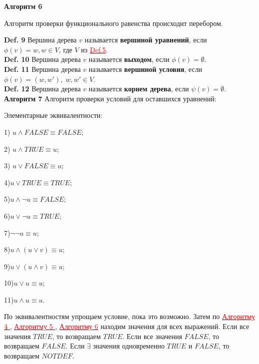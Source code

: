 \documentclass[12pt]{article}
\begin{document}
      \hypertarget{a6}{{\bf Алгоритм 6}} Алгоритм проверки функционального равенства происходит перебором.
     
     
     {\bf Def. 9} Вершина дерева $v$ называется {\bf вершиной уравнений}, если
     $\phi(v)=w , w \in V$, где $V$ из \hyperlink{d5}{ \textcolor{red}{Def.5}}.
     \\
     
     {\bf Def. 10} Вершина дерева $v$ называется {\bf выходом}, если
     $\phi(v)= \emptyset$.
     \\
      
     {\bf Def. 11} Вершина дерева $v$ называется {\bf вершиной условия}, если
     $\phi(v)=(w,w') ,\; w,w' \in V$.
     \\
     
     {\bf Def. 12}  Вершина дерева $v$ называется {\bf корнем дерева}, если
      $\psi(v) = \emptyset$.
      \\
      
      \hypertarget{a7}{{\bf Алгоритм 7}} Алгоритм проверки условий для оставшихся уравнений:
      
      Элементарные эквивалентности:
      
     1) $u\wedge FALSE\equiv FALSE$;
     
     2) $u\wedge TRUE\equiv u$;
     
     3) $u\vee FALSE\equiv u$;
     
     4)$u\vee TRUE\equiv TRUE$;
     
     5)$u \wedge \neg u \equiv FALSE$;
     
     6)$u \vee \neg u \equiv TRUE$;
     
     7)$\neg \neg u \equiv u$;
     
     8)$u\wedge (u \vee v)\equiv u$;
     
     9)$u\vee (u \wedge v)\equiv u$;
     
     10)$u \vee u \equiv u$;
     
     11)$u \wedge u \equiv u$.
     
       
       По эквивалентностям упрощаем условие, пока это возможно. Затем по   \hyperlink{a4}{ \textcolor{red}{Алгоритму 4 }},  \hyperlink{a5}{ \textcolor{red}{Алгоритму 5 }},  \hyperlink{a6}{ \textcolor{red}{Алгоритму 6}} находим значения для всех выражений. Если все значения $TRUE$, то возвращаем $TRUE$. Если все значения $FALSE$, то возвращаем $FALSE$. Если $\exists$ значения одновременно $TRUE$ и $FALSE$, то возвращаем $NOTDEF$.
      \\
      
\end{document}
